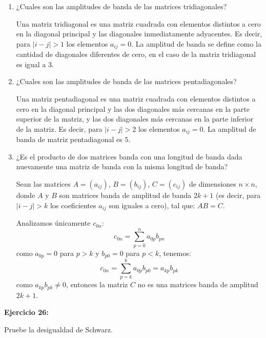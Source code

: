 \documentclass[12pt]{article}
\begin{document}
\begin{enumerate}

\item ¿Cuales son las amplitudes de banda de las matrices tridiagonales?

Una matriz tridiagonal es una matriz cuadrada con elementos distintos a cero en la diagonal principal y las diagonales inmediatamente adyacentes. Es decir, para $\vert i - j\vert > 1$ los elementos $a_{ij} = 0$. La amplitud de banda se define como la cantidad de diagonales diferentes de cero, en el caso de la matriz tridiagonal es igual a $3$.

\item ¿Cuales son las amplitudes de banda de las matrices pentadiagonales?

Una matriz pentadiagonal es una matriz cuadrada con elementos distintos a cero en la diagonal principal y las dos diagonales más cercanas en la parte superior de la matriz, y las dos diagonales más cercanas en la parte inferior de la matriz. Es decir, para $\vert i - j\vert > 2$ los elementos $a_{ij} = 0$. La amplitud de banda de matriz pentadiagonal es $5$.

\item ¿Es el producto de dos matrices banda con una longitud de banda dada nuevamente una matriz de banda con la misma longitud de banda?

Sean las matrices $A = (a_{ij})$, $B = (b_{ij})$, $C = (c_{ij})$ de dimensiones $n \times n$, donde $A$ y $B$ son matrices banda de amplitud de banda $2k+1$ (es decir, para $\vert i - j\vert > k$ los coeficientes $a_{ij}$ son iguales a cero), tal que: $AB = C$.

Analizamos únicamente $c_{0n}$:
\begin{equation}
    c_{0n} = \sum_{p=0}^{n} a_{0p} b_{pn} 
\end{equation}
como $a_{0p} = 0$ para $p>k$ y $b_{p0} = 0$ para $p<k$, tenemos:
\begin{equation}
    c_{0n} = \sum_{p=k}^{k} a_{0p} b_{p0} =  a_{kp} b_{pk}
\end{equation}
como $a_{kp} b_{pk} \neq 0$, entonces la matriz $C$ no es una matrices banda de amplitud $2k+1$.

\end{enumerate}

%
\noindent \textbf{Ejercicio 26:}

Pruebe la desigualdad de Schwarz.\\
\end{document}
